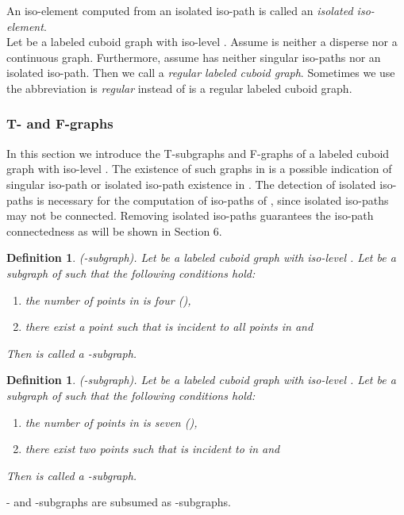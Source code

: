 \documentclass[a4paper,11pt]{article}
\newtheorem{definition}[theorem]{Definition}
\begin{document}
An iso-element computed from an isolated iso-path is called
an {\it isolated iso-element}.\\

Let  be a labeled cuboid graph
with iso-level . Assume  is neither a disperse nor a continuous graph. Furthermore,
assume  has neither singular iso-paths nor an isolated iso-path. Then we call  a {\it regular
labeled cuboid graph}. Sometimes we use the abbreviation  is {\it regular} instead of  is a
regular labeled cuboid graph.

\subsubsection{T- and F-graphs}
In this section we introduce the T-subgraphs and F-graphs of a labeled cuboid graph 
with iso-level . The existence of such graphs in  is a possible indication of singular
iso-path or isolated iso-path existence in . The detection of isolated iso-paths is necessary
for the computation of iso-paths of , since isolated iso-paths may not be connected. Removing
isolated iso-paths guarantees the iso-path connectedness as will be shown in Section 6.

\begin{definition}(-subgraph). Let  be a labeled cuboid graph
with iso-level . Let  be a subgraph of  such that the following
conditions hold:
\begin{enumerate}
\item the number of points in  is four (),
\item there exist a point  such that  is incident to all points  in  and

\end{enumerate}
Then  is called a -subgraph.
\label{def:iso-path-2}
\end{definition}

\begin{definition}(-subgraph). Let  be a labeled cuboid graph
with iso-level . Let  be a subgraph of  such that the following
conditions hold:
\begin{enumerate}
\item the number of points in  is seven (),
\item there exist two points  such that  is incident to  in  and

\end{enumerate}
Then  is called a -subgraph.
\label{def:iso-path-3}
\end{definition}
\noindent - and -subgraphs are subsumed as -subgraphs.
\end{document}
